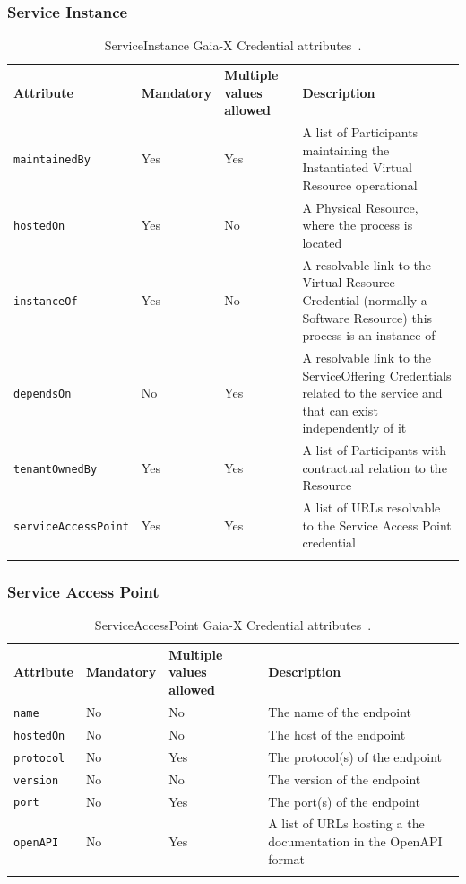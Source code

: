 \subsubsection{Service Instance}

\begin{longtable}{ |p{4cm}|p{2cm}|p{2cm}|p{7cm}| }
    \hhline{----}
    \textbf{Attribute} & \textbf{Mandatory} & \textbf{Multiple values allowed} & \textbf{Description}\\
    \hhline{----}
    \texttt{maintainedBy} & Yes & Yes & A list of Participants maintaining the Instantiated Virtual Resource operational\\
    \hhline{----}
    \texttt{hostedOn} & Yes & No & A Physical Resource, where the process is located\\
    \hhline{----}
    \texttt{instanceOf} & Yes & No & A resolvable link to the Virtual Resource Credential (normally a Software Resource) this process is an instance of\\
    \hhline{----}
    \texttt{dependsOn} & No & Yes & A resolvable link to the ServiceOffering Credentials related to the service and that can exist independently of it\\
    \hhline{----}
    \texttt{tenantOwnedBy} & Yes & Yes & A list of Participants with contractual relation to the Resource\\
    \hhline{----}
    \texttt{serviceAccessPoint} & Yes & Yes & A list of URLs resolvable to the Service Access Point credential\\
    \hhline{----}
    \caption{ServiceInstance Gaia-X Credential attributes~\cite{gaiax_trust_framework}.}
    \label{tab:service_instance}
\end{longtable}

\subsubsection{Service Access Point}

\begin{longtable}{ |p{4cm}|p{2cm}|p{2cm}|p{7cm}| }
    \hhline{----}
    \textbf{Attribute} & \textbf{Mandatory} & \textbf{Multiple values allowed} & \textbf{Description}\\
    \hhline{----}
    \texttt{name} & No & No & The name of the endpoint\\
    \hhline{----}
    \texttt{hostedOn} & No & No & The host of the endpoint\\
    \hhline{----}
    \texttt{protocol} & No & Yes & The protocol(s) of the endpoint\\
    \hhline{----}
    \texttt{version} & No & No & The version of the endpoint\\
    \hhline{----}
    \texttt{port} & No & Yes & The port(s) of the endpoint\\
    \hhline{----}
    \texttt{openAPI} & No & Yes & A list of URLs hosting a the documentation in the OpenAPI format\\
    \hhline{----}
    \caption{ServiceAccessPoint Gaia-X Credential attributes~\cite{gaiax_trust_framework}.}
    \label{tab:service_access_point}
\end{longtable}

